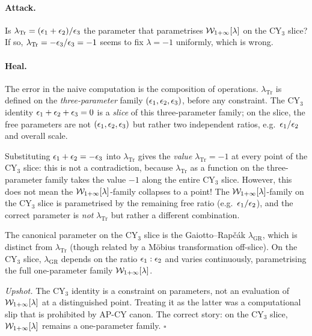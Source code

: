 \paragraph{Attack.}
Is $\lambda_{\mathrm{Tr}} = (\epsilon_1 + \epsilon_2)/\epsilon_3$ the parameter that parametrises
$\mathcal{W}_{1+\infty}[\lambda]$ on the CY$_3$ slice? If so, $\lambda_{\mathrm{Tr}} = -\epsilon_3/\epsilon_3 = -1$
seems to fix $\lambda = -1$ uniformly, which is wrong.

\paragraph{Heal.}
The error in the naive computation is the composition of operations. $\lambda_{\mathrm{Tr}}$
is defined on the \emph{three-parameter} family $(\epsilon_1, \epsilon_2, \epsilon_3)$, before any
constraint. The CY$_3$ identity $\epsilon_1 + \epsilon_2 + \epsilon_3 = 0$ is a \emph{slice} of this
three-parameter family; on the slice, the free parameters are not $(\epsilon_1, \epsilon_2, \epsilon_3)$
but rather two independent ratios, e.g.\ $\epsilon_1/\epsilon_2$ and overall scale.

Substituting $\epsilon_1 + \epsilon_2 = -\epsilon_3$ into $\lambda_{\mathrm{Tr}}$ gives the
\emph{value} $\lambda_{\mathrm{Tr}} = -1$ at every point of the CY$_3$ slice: this is
not a contradiction, because $\lambda_{\mathrm{Tr}}$ as a function on the three-parameter
family takes the value $-1$ along the entire CY$_3$ slice. However, this does not mean
the $\mathcal{W}_{1+\infty}[\lambda]$-family collapses to a point! The $\mathcal{W}_{1+\infty}[\lambda]$-family on
the CY$_3$ slice is parametrised by the remaining free ratio (e.g.\ $\epsilon_1/\epsilon_2$),
and the correct parameter is \emph{not} $\lambda_{\mathrm{Tr}}$ but rather a different
combination.

The canonical parameter on the CY$_3$ slice is the Gaiotto--Rap\v c\'ak $\lambda_{\mathrm{GR}}$,
which is distinct from $\lambda_{\mathrm{Tr}}$ (though related by a Möbius transformation
off-slice). On the CY$_3$ slice, $\lambda_{\mathrm{GR}}$ depends on the ratio
$\epsilon_1 : \epsilon_2$ and varies continuously, parametrising the full one-parameter family
$\mathcal{W}_{1+\infty}[\lambda]$.

\emph{Upshot.} The CY$_3$ identity is a constraint on parameters, not an evaluation
of $\mathcal{W}_{1+\infty}[\lambda]$ at a distinguished point. Treating it as the latter was a
computational slip that is prohibited by AP-CY canon. The correct story: on the
CY$_3$ slice, $\mathcal{W}_{1+\infty}[\lambda]$ remains a one-parameter family.
\hfill$\square$

